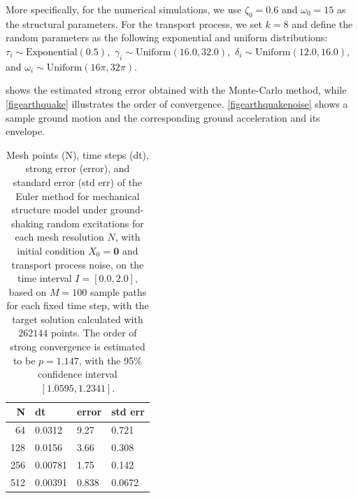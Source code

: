 \documentclass[reqno,12pt]{amsart}
\theoremstyle{plain} %
\theoremstyle{definition} %
\begin{document}
More specifically, for the numerical simulations, we use $\zeta_0 = 0.6$ and $\omega_0 = 15$ as the structural parameters. For the transport process, we set $k=8$ and define the random parameters as the following exponential and uniform distributions: $\tau_i \sim \textrm{Exponential}(0.5),$ $\gamma_i \sim \textrm{Uniform}(16.0, 32.0),$ $\delta_i \sim \textrm{Uniform}(12.0, 16.0),$ and $\omega_i \sim \textrm{Uniform}(16\pi, 32\pi).$

 shows the estimated strong error obtained with the Monte-Carlo method, while \cref{figearthquake} illustrates the order of convergence. \cref{figearthquakenoise} shows a sample ground motion and the corresponding ground acceleration and its envelope.

\begin{table}
    \begin{center}
        \begin{tabular}[htb]{|r|l|l|l|}
            \hline N & dt & error & std err \\
            \hline \hline
            64 & 0.0312 & 9.27 & 0.721 \\
            128 & 0.0156 & 3.66 & 0.308 \\
            256 & 0.00781 & 1.75 & 0.142 \\
            512 & 0.00391 & 0.838 & 0.0672 \\
            \hline
        \end{tabular}
    \end{center}

    \bigskip

    \caption{Mesh points (N), time steps (dt), strong error (error), and standard error (std err) of the Euler method for mechanical structure model under ground-shaking random excitations for each mesh resolution $N$, with initial condition $X_0 = \mathbf{0}$ and transport process noise, on the time interval $I = [0.0, 2.0]$, based on $M = 100$ sample paths for each fixed time step, with the target solution calculated with $262144$ points. The order of strong convergence is estimated to be $p = 1.147$, with the 95\% confidence interval $[1.0595, 1.2341]$.}

    \label{tableearthquake}
\end{table}
\end{document}
